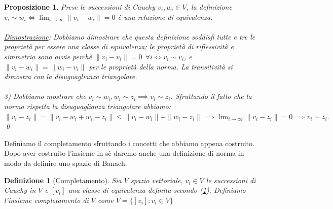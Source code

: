 \documentclass[a4paper,12pt]{report}
\newtheorem{definizione}{Definizione}[chapter]
\newtheorem{proposizione}{Proposizione}[chapter]
\begin{document}
\begin{proposizione}\label{prop: 2.3}
    Prese le successioni di Cauchy $v_i,w_i \in V$, la definizione 
    \\$v_i \sim w_i \iff\displaystyle\lim_{i \to \infty}\|v_i-w_i\|=0$ è una relazione di equivalenza.
    \\
    \\ \underline{Dimostrazione}: Dobbiamo dimostrare che questa definizione soddisfi tutte e tre le proprietà per essere una classe di equivalenza; le proprietà di riflessività e simmetria sono ovvie perchè $\|v_i-v_i\|=0 \ \ \forall i \iff v_i \sim v_i$, e $\|v_i-w_i\|=\|w_i-v_i\|$ per le proprietà della norma. La transitività si dimostra con la disuguaglianza triangolare.
    \\
    \\ 3) Dobbiamo mostrare che $v_i \sim w_i, w_i \sim z_i \implies v_i \sim z_i$. Sfruttando il fatto che la norma rispetta la disuguaglianza triangolare abbiamo: 
    \\$\|v_i-z_i\|=\|v_i-w_i+w_i-z_i\| \leq \|v_i-w_i\|+\|w_i-z_i\| \implies \displaystyle\lim_{i \to \infty}\|v_i-z_i\| =0 \implies v_i \sim z_i.$ \qed
\end{proposizione}

Definiamo il completamento sfruttando i concetti che abbiamo appena costruito. Dopo aver costruito l'insieme in sè daremo anche una definizione di norma in modo da definire uno spazio di Banach.

\newpage

\begin{definizione}[Completamento]\label{def: 2.10}
    Sia $V$ spazio vettoriale, $v_i\in V$ le successioni di Cauchy in $V$ e $[v_i]$ una classe di equivalenza definita secondo (\ref{prop: 2.3}). Definiamo l'insieme completamento di $V$ come $\tilde{V}=\{[v_i]:v_i \in V\} $
\end{definizione}
\end{document}
